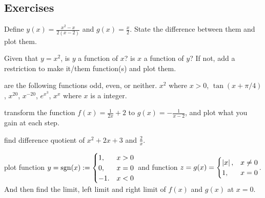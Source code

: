 \documentclass[Calculus 1 Recitation.tex]{subfiles}
\begin{document}
\subsection{Exercises}

\begin{myleftlinebox}
	Define $y(x) = \frac{x^2-x}{2(x-2)}$ and $g(x) = \frac{x}{2}$. State the difference between them and plot them.
	\tcblower
	\vspace{2em}
\end{myleftlinebox}

\begin{myleftlinebox}
	Given that $y=x^2$, is $y$ a function of $x$? is $x$ a function of $y$? If not, add a restriction to make it/them function(s) and plot them.
	\tcblower
	\vspace{2em}
\end{myleftlinebox}


\begin{myleftlinebox}
	are the following functions odd, even, or neither. \(x^2\) where \(x>0\), \(\tan(x+\pi/4)\), \(x^{20}\), \(x^{-20}\), \(e^{x^3}\), $x^x$ where $x$ is a integer.
	\tcblower
	\vspace{5em}
\end{myleftlinebox}

\begin{myleftlinebox}
	transform the function $f(x)=\frac{1}{2x}+2$ to $g(x)=-\frac{1}{x-2}$, and plot what you gain at each step.
	\tcblower
	\vspace{2em}
\end{myleftlinebox}

\begin{myleftlinebox}
	find difference quotient of \(x^2+2x+3\) and \(\frac{2}{x}\).
	\tcblower
	\vspace{2em}
\end{myleftlinebox}

\begin{myleftlinebox}
	plot function $y=\operatorname{\mathrm{sgn}}(x) := \begin{cases}
		1, & x>0\\
		0, & x=0\\
		-1.& x<0
	\end{cases}$ and function $z = g(x)=\begin{cases}
		\left\vert x\right\vert,& x\neq 0\\
		1, &x=0
	\end{cases}$. And then find the limit, left limit and right limit of $f(x)$ and $g(x)$ at $x=0$.
	\tcblower
	\vspace{3em}
\end{myleftlinebox}
\end{document}
